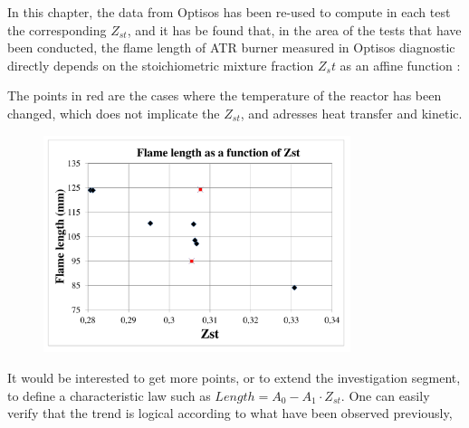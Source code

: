 In this chapter, the data from Optisos has been re-used to compute in each test the corresponding $Z_{st}$, and it has be found that, in the area of the tests that have been conducted, the flame length of ATR burner measured in Optisos diagnostic directly depends on the stoichiometric mixture fraction $Z_st$ as an affine function :

The points in red are the cases where the temperature of the reactor has been changed, which does not implicate the $Z_{st}$, and adresses heat transfer and kinetic.

\begin{figure}[h!]
  \centering
\includegraphics[width=0.8\textwidth]{fig/Flame_length_Zst.pdf}
 \label{Flame length as a function of Zst}
\end{figure}

It would be interested to get more points, or to extend the investigation segment, to define a characteristic law such as $Length=A_{0}-A_{1}\cdot Z_{st}$. One can easily verify that the trend is logical according to what have been observed previously, 